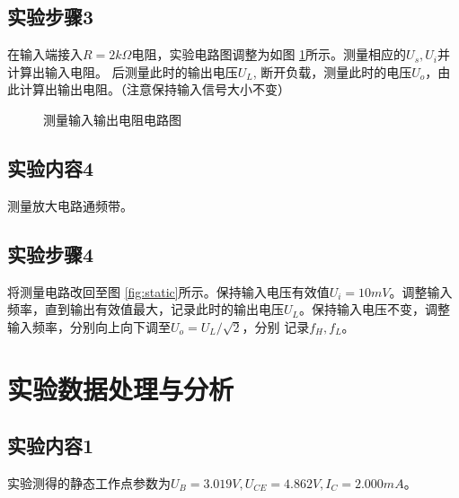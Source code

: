\documentclass[a4paper,11pt,UTF8]{ctexart}
\begin{document}
\subsection{实验步骤3}
在输入端接入$R=2k\Omega$电阻，实验电路图调整为如图 \ref{fig:inAndOutR}所示。测量相应的$U_s,U_i$并计算出输入电阻。
后测量此时的输出电压$U_L$, 断开负载，测量此时的电压$U_o$，由此计算出输出电阻。（注意保持输入信号大小不变）
\begin{figure}[htbp]
  \centering
  \caption{测量输入输出电阻电路图}
  \label{fig:inAndOutR}
  \end{figure}

\subsection{实验内容4}
测量放大电路通频带。
\subsection{实验步骤4}
将测量电路改回至图 \ref{fig:static}所示。保持输入电压有效值$U_i=10mV$。调整输入频率，直到输出有效值最大，记录此时的输出电压$U_L$。保持输入电压不变，调整输入频率，分别向上向下调至$U_o=U_L/\sqrt{2}$，分别
记录$f_H,f_L$。
\section{实验数据处理与分析}
\subsection{实验内容1}
	实验测得的静态工作点参数为$U_B=3.019V,U_{CE}=4.862V, I_C=2.000mA$。
\end{document}

